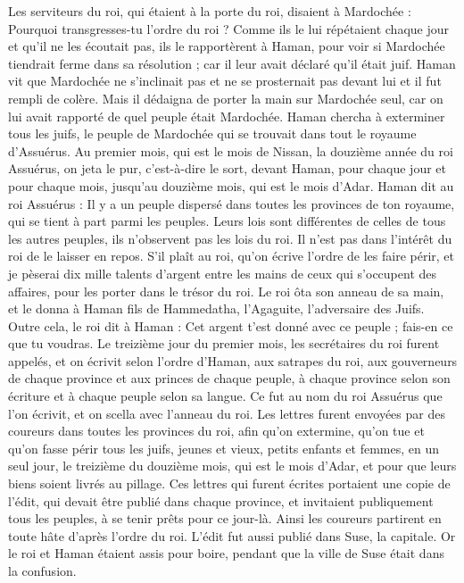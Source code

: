 \begin{multicols}{2}
Les serviteurs du roi, qui étaient à la porte du roi, disaient à Mardochée : Pourquoi transgresses-tu l’ordre du roi ?
Comme ils le lui répétaient chaque jour et qu'il ne les écoutait pas, ils le rapportèrent à Haman, pour voir si Mardochée tiendrait ferme dans sa résolution ; car il leur avait déclaré qu'il était juif.
Haman vit que Mardochée ne s'inclinait pas et ne se prosternait pas devant lui et il fut rempli de colère.
Mais il dédaigna de porter la main sur Mardochée seul, car on lui avait rapporté de quel peuple était Mardochée. Haman chercha à exterminer tous les juifs, le peuple de Mardochée qui se trouvait dans tout le royaume d'Assuérus.
Au premier mois, qui est le mois de Nissan, la douzième année du roi Assuérus, on jeta le pur, c'est-à-dire le sort, devant Haman, pour chaque jour et pour chaque mois, jusqu’au douzième mois, qui est le mois d'Adar.
Haman dit au roi Assuérus : Il y a un peuple dispersé dans toutes les provinces de ton royaume, qui se tient à part parmi les peuples. Leurs lois sont différentes de celles de tous les autres peuples, ils n’observent pas les lois du roi. Il n'est pas dans l’intérêt du roi de le laisser en repos.
S'il plaît au roi, qu'on écrive l’ordre de les faire périr, et je pèserai dix mille talents d'argent entre les mains de ceux qui s’occupent des affaires, pour les porter dans le trésor du roi.
Le roi ôta son anneau de sa main, et le donna à Haman fils de Hammedatha, l’Agaguite, l’adversaire des Juifs.
Outre cela, le roi dit à Haman : Cet argent t'est donné avec ce peuple ; fais-en ce que tu voudras.
Le treizième jour du premier mois, les secrétaires du roi furent appelés, et on écrivit selon l’ordre d'Haman, aux satrapes du roi, aux gouverneurs de chaque province et aux princes de chaque peuple, à chaque province selon son écriture et à chaque peuple selon sa langue. Ce fut au nom du roi Assuérus que l’on écrivit, et on scella avec l'anneau du roi.
Les lettres furent envoyées par des coureurs dans toutes les provinces du roi, afin qu'on extermine, qu’on tue et qu’on fasse périr tous les juifs, jeunes et vieux, petits enfants et femmes, en un seul jour, le treizième du douzième mois, qui est le mois d'Adar, et pour que leurs biens soient livrés au pillage.
Ces lettres qui furent écrites portaient une copie de l’édit, qui devait être publié dans chaque province, et invitaient publiquement tous les peuples, à se tenir prêts pour ce jour-là.
Ainsi les coureurs partirent en toute hâte d’après l’ordre du roi. L'édit fut aussi publié dans Suse, la capitale. Or le roi et Haman étaient assis pour boire, pendant que la ville de Suse était dans la confusion.

\end{multicols}
